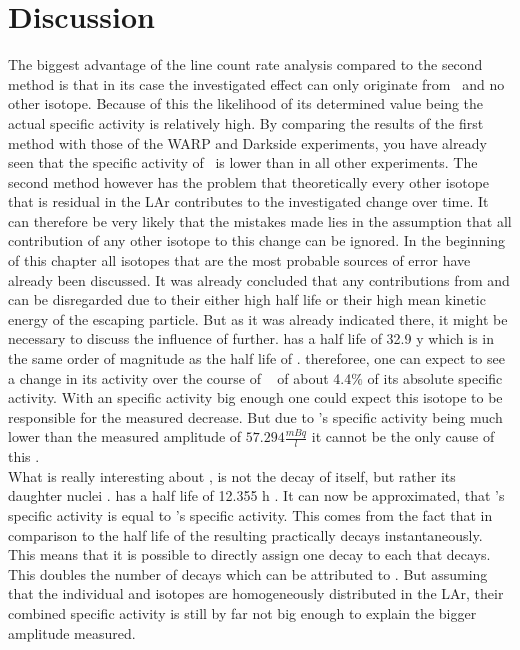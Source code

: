 \section{Discussion}
\label{Discussion}

The biggest advantage of the line count rate analysis compared to the second method is that in its case the investigated effect can only originate from \Kr\ and no other isotope.
Because of this the likelihood of its determined value being the actual specific activity is relatively high.
By comparing the results of the first method with those of the WARP and Darkside experiments, you have already seen that the specific activity of \Kr\ is lower than in all other experiments.
The second method however has the problem that theoretically every other isotope that is residual in the LAr contributes to the investigated change over time.
It can therefore be very likely that the mistakes made lies in the assumption that all contribution of any other isotope to this change can be ignored. 
In the beginning of this chapter all isotopes that are the most probable sources of error have already been discussed.
It was already concluded that any contributions from  and  can be disregarded due to their either high half life or their high mean kinetic energy of the escaping particle.
But as it was already indicated there, it might be necessary to discuss the influence of  further.
 has a half life of 32.9 y which is in the same order of magnitude as the half life of \Kr.
thereforee, one can expect to see a change in its activity over the course of \PII~ of about 4.4$\%$ of its absolute specific activity.
With an specific activity big enough one could expect this isotope to be responsible for the measured decrease.
But due to 's specific activity being much lower than the measured amplitude of $57.294 \frac{\unit{mBq}}{\unit{l}}$  it cannot be the only cause of this .
\\

What is really interesting about , is not the decay of  itself, but rather its daughter nuclei .
 has a half life of 12.355 h \cite{chen_nuclear_2016}.
It can now be approximated, that 's specific activity is equal to 's specific activity.
This comes from the fact that in comparison to the half life of  the resulting  practically decays instantaneously.
This means that it is possible to directly assign one  decay to each  that decays.
This doubles the number of decays which can be attributed to .
But assuming that the individual  and  isotopes are homogeneously distributed in the LAr, their combined specific activity is still by far not big enough to explain the bigger amplitude measured.
\\

